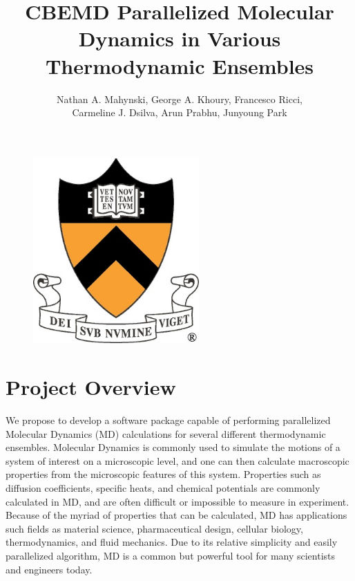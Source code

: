 \documentclass[10pt]{article}
\title{\textbf{CBEMD} Parallelized Molecular Dynamics in Various Thermodynamic Ensembles}
\author{Nathan A. Mahynski, George A. Khoury, Francesco Ricci, \\Carmeline J. Dsilva, Arun Prabhu, Junyoung Park}
\date{}
\begin{document}
\maketitle
\begin{figure}[htbp]
   \centering
   \includegraphics[width=2.5in]{princeton.jpg}
\end{figure}
\thispagestyle{empty}
\newpage
\setcounter{page}{1}
\newpage

\section{Project Overview}
We propose to develop a software package capable of performing parallelized Molecular Dynamics (MD) calculations for several different thermodynamic ensembles. Molecular Dynamics is commonly used to simulate the motions of a system of interest on a microscopic level, and one can then calculate macroscopic properties from the microscopic features of this system. Properties such as diffusion coefficients, specific heats, and chemical potentials are commonly calculated in MD, and are often difficult or impossible to measure in experiment.  Because of the myriad of properties that can be calculated, MD has applications such fields as material science, pharmaceutical design, cellular biology, thermodynamics, and fluid mechanics.  Due to its relative simplicity and easily parallelized algorithm, MD is a common but powerful tool for many scientists and engineers today.
\end{document}

